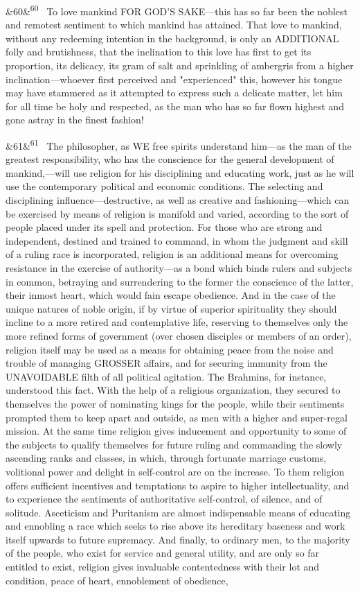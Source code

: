 \documentclass[12pt]{article}
\newcommand{\para}[1][]{\par\noindent\ifx&#1&\else\textsuperscript{\footnotesize #1}~\fi}
\begin{document}
\para[60] To love mankind FOR GOD'S SAKE---this has so far been the noblest and remotest sentiment to which mankind has attained. That love to mankind, without any redeeming intention in the background, is only an ADDITIONAL folly and brutishness, that the inclination to this love has first to get its proportion, its delicacy, its gram of salt and sprinkling of ambergris from a higher inclination---whoever first perceived and "experienced" this, however his tongue may have stammered as it attempted to express such a delicate matter, let him for all time be holy and respected, as the man who has so far flown highest and gone astray in the finest fashion!

\para[61] The philosopher, as WE free spirits understand him---as the man of the greatest responsibility, who has the conscience for the general development of mankind,---will use religion for his disciplining and educating work, just as he will use the contemporary political and economic conditions. The selecting and disciplining influence---destructive, as well as creative and fashioning---which can be exercised by means of religion is manifold and varied, according to the sort of people placed under its spell and protection. For those who are strong and independent, destined and trained to command, in whom the judgment and skill of a ruling race is incorporated, religion is an additional means for overcoming resistance in the exercise of authority---as a bond which binds rulers and subjects in common, betraying and surrendering to the former the conscience of the latter, their inmost heart, which would fain escape obedience. And in the case of the unique natures of noble origin, if by virtue of superior spirituality they should incline to a more retired and contemplative life, reserving to themselves only the more refined forms of government (over chosen disciples or members of an order), religion itself may be used as a means for obtaining peace from the noise and trouble of managing GROSSER affairs, and for securing immunity from the UNAVOIDABLE filth of all political agitation. The Brahmins, for instance, understood this fact. With the help of a religious organization, they secured to themselves the power of nominating kings for the people, while their sentiments prompted them to keep apart and outside, as men with a higher and super-regal mission. At the same time religion gives inducement and opportunity to some of the subjects to qualify themselves for future ruling and commanding the slowly ascending ranks and classes, in which, through fortunate marriage customs, volitional power and delight in self-control are on the increase. To them religion offers sufficient incentives and temptations to aspire to higher intellectuality, and to experience the sentiments of authoritative self-control, of silence, and of solitude. Asceticism and Puritanism are almost indispensable means of educating and ennobling a race which seeks to rise above its hereditary baseness and work itself upwards to future supremacy. And finally, to ordinary men, to the majority of the people, who exist for service and general utility, and are only so far entitled to exist, religion gives invaluable contentedness with their lot and condition, peace of heart, ennoblement of obedience, 
\end{document}

